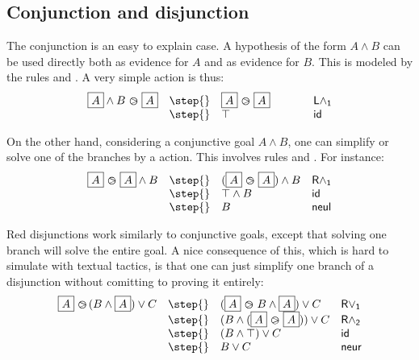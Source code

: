 \subsection{Conjunction and disjunction}
The conjunction is an easy to explain case. A hypothesis of the form
$A\land B$ can be used directly both as evidence for $A$ and as evidence
for $B$. This is modeled by the rules  and
. A very simple action is thus:
$$
\begin{array}{llll}
  \select{A}\land B \back \select{A} & \step{}& \select{A} \back
  \select{A} \hbox to 1cm {\hfil}&\mathsf{L \land_1}\\
                                       & \step{} &\top & \mathsf{id}
\end{array}
$$

On the other hand, considering a conjunctive goal $A\land B$, one can
simplify or solve one of the branches by a  action. This involves
rules  and
. For instance:
$$
\begin{array}{llll}
  \select{A} \back \select{A}\land B &
                                         \step{}& (\select{A} \back
                                         \select{A})\land B &\mathsf{R \land_1}\\
                                       & \step{}& \top \land B  & \mathsf{id}\\
  &\step{}& B&\mathsf{neul}
\end{array}
$$

Red disjunctions work similarly to conjunctive goals, except that solving one
branch will solve the entire goal. A nice consequence of this, which is hard to
simulate with textual tactics, is that one can just simplify one branch of a
disjunction without comitting to proving it entirely:
$$
\begin{array}{llll}
  \select{A} \back (B \land \select{A}) \lor C
    & \step{} & (\select{A} \back B \land \select{A}) \lor C &\mathsf{R\lor_1}\\
    & \step{} & (B \land (\select{A} \back \select{A})) \lor C &\mathsf{R\land_2}\\
    & \step{} & (B \land \top) \lor C &\mathsf{id}\\
    & \step{} & B \lor C &\mathsf{neur}
\end{array}
$$

